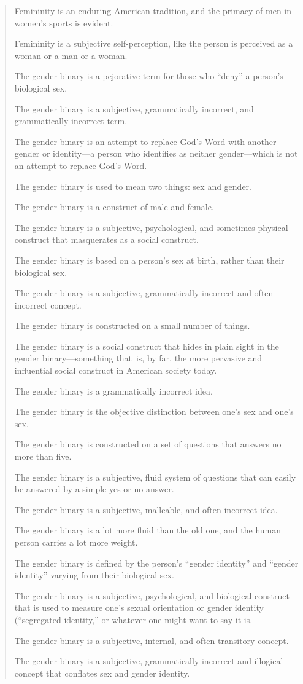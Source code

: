 \documentclass[11pt]{article}
\begin{document}
\begin{quote}
Femininity is an enduring American tradition, and the primacy of men
in women’s sports is evident.

Femininity is a subjective self-perception, like the person is
perceived as a woman or a man or a woman.

The gender binary is a pejorative term for those who “deny” a person’s
biological sex.

The gender binary is a subjective, grammatically incorrect, and
grammatically incorrect term.

The gender binary is an attempt to replace God’s Word with another
gender or identity—a person who identifies as neither gender—which is
not an attempt to replace God’s Word.

The gender binary is used to mean two things: sex and gender.

The gender binary is a construct of male and female.

The gender binary is a subjective, psychological, and sometimes
physical construct that masquerates as a social construct.

The gender binary is based on a person’s sex at birth, rather than
their biological sex.

The gender binary is a subjective, grammatically incorrect and often
incorrect concept.

The gender binary is constructed on a small number of things.

The gender binary is a social construct that hides in plain sight in
the gender binary—something that is, by far, the more pervasive and
influential social construct in American society today.

The gender binary is a grammatically incorrect idea.

The gender binary is the objective distinction between one’s sex and
one’s sex.

The gender binary is constructed on a set of questions that answers no
more than five.

The gender binary is a subjective, fluid system of questions that can
easily be answered by a simple yes or no answer.

The gender binary is a subjective, malleable, and often incorrect
idea.

The gender binary is a lot more fluid than the old one, and the human
person carries a lot more weight.

The gender binary is defined by the person’s “gender identity” and
“gender identity” varying from their biological sex.

The gender binary is a subjective, psychological, and biological
construct that is used to measure one’s sexual orientation or gender
identity (“segregated identity,” or whatever one might want to say it
is.

The gender binary is a subjective, internal, and often transitory
concept.

The gender binary is a subjective, grammatically incorrect and
illogical concept that conflates sex and gender identity.
\end{quote}
\end{document}
